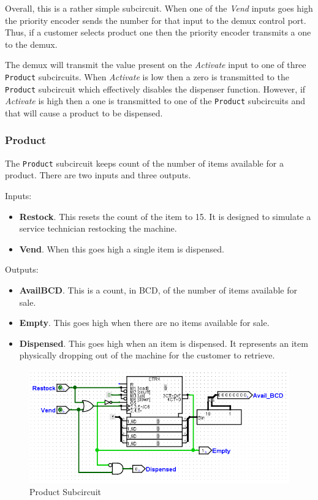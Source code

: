 Overall, this is a rather simple subcircuit. When one of the \textit{Vend} inputs goes high the priority encoder sends the number for that input to the demux control port. Thus, if a customer selects product one then the priority encoder transmits a one to the demux.

The demux will transmit the value present on the \textit{Activate} input to one of three \lstinline[columns=fixed]|Product| subcircuits. When \textit{Activate} is low then a zero is transmitted to the \lstinline[columns=fixed]|Product| subcircuit which effectively disables the dispenser function. However, if \textit{Activate} is high then a one is transmitted to one of the \lstinline[columns=fixed]|Product| subcircuits and that will cause a product to be dispensed.

\subsubsection{Product}

The \lstinline[columns=fixed]|Product| subcircuit keeps count of the number of items available for a product. There are two inputs and three outputs.

Inputs:

\begin{itemize}
	\item \textbf{Restock}. This resets the count of the item to 15. It is designed to simulate a service technician restocking the machine.
	\item \textbf{Vend}. When this goes high a single item is dispensed.
\end{itemize}

Outputs:

\begin{itemize}
	\item \textbf{AvailBCD}. This is a count, in \ac{BCD}, of the number of items available for sale.
	\item \textbf{Empty}. This goes high when there are no items available for sale.
	\item \textbf{Dispensed}. This goes high when an item is dispensed. It represents an item physically dropping out of the machine for the customer to retrieve.
\end{itemize}

\begin{figure}[H]
	\centering
	\includegraphics[width=\maxwidth{.95\linewidth}]{gfx/vend-05}
	\caption{Product Subcircuit}
	\label{fig:vend-05}
\end{figure}

